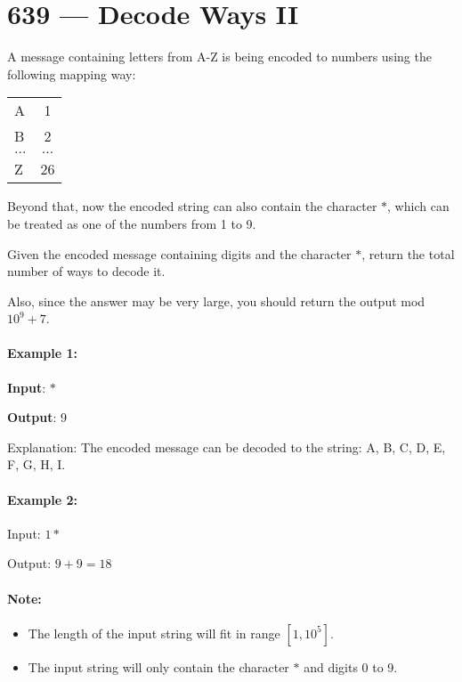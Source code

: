 \section{639 --- Decode Ways II}
A message containing letters from A-Z is being encoded to numbers using the following mapping way:

\begin{table}[H]
\begin{tabular}{lc}
\hline
 A & 1 \\
B & 2\\
$\ldots$  & $\ldots$ \\
Z & 26 \\
\hline
\end{tabular}
\end{table}

Beyond that, now the encoded string can also contain the character $\ast$, which can be treated as one of the numbers from 1 to 9.

Given the encoded message containing digits and the character $\ast$, return the total number of ways to decode it.

Also, since the answer may be very large, you should return the output mod $10^9 + 7$.

\paragraph{Example 1:}

\begin{flushleft}
\textbf{Input}: $\ast$

\textbf{Output}: 9

Explanation: The encoded message can be decoded to the string: A, B, C, D, E, F, G, H, I.
\end{flushleft}

\paragraph{Example 2:}

\begin{flushleft}
Input: $1\ast$

Output: $9 + 9 = 18$

\end{flushleft}

\paragraph{Note:}

\begin{itemize}
\item The length of the input string will fit in range $[1, 10^5]$.
\item The input string will only contain the character $\ast$ and digits 0 to 9.
\end{itemize}


